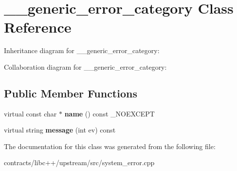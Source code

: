 \hypertarget{class____generic__error__category}{}\section{\+\_\+\+\_\+generic\+\_\+error\+\_\+category Class Reference}
\label{class____generic__error__category}


Inheritance diagram for \+\_\+\+\_\+generic\+\_\+error\+\_\+category\+:


Collaboration diagram for \+\_\+\+\_\+generic\+\_\+error\+\_\+category\+:
\subsection*{Public Member Functions}
\begin{DoxyCompactItemize}
\item 
\mbox{\label{class____generic__error__category_a225f6e73f33714a5dae5206859ec9eef}} 
virtual const char $\ast$ {\bfseries name} () const \+\_\+\+N\+O\+E\+X\+C\+E\+PT
\item 
\mbox{\label{class____generic__error__category_a3cb540c8e30ead55c62408cd23384ec4}} 
virtual string {\bfseries message} (int ev) const
\end{DoxyCompactItemize}


The documentation for this class was generated from the following file\+:\begin{DoxyCompactItemize}
\item 
contracts/libc++/upstream/src/system\+\_\+error.\+cpp\end{DoxyCompactItemize}
